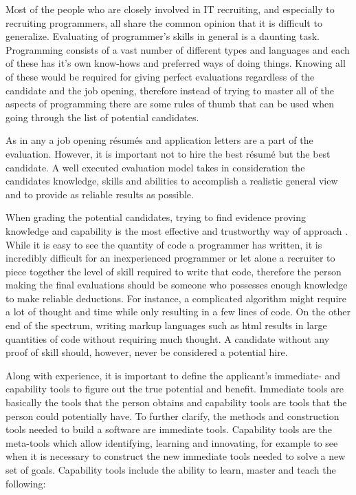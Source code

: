 \documentclass[11pt,a4paper,oneside,article]{memoir}
\begin{document}

Most of the people who are closely involved in IT recruiting, and especially to recruiting programmers, all share the common opinion that it is difficult to generalize. Evaluating of programmer's skills in general is a daunting task. Programming consists of a vast number of different types and languages and each of these has it's own know-hows and preferred ways of doing things. Knowing all of these would be required for giving perfect evaluations regardless of the candidate and the job opening, therefore instead of trying to master all of the aspects of programming there are some rules of thumb that can be used when going through the list of potential candidates.

As in any a job opening résumés and application letters are a part of the evaluation. However, it is important not to hire the best résumé but the best candidate. A well executed evaluation model takes in consideration the candidates knowledge, skills and abilities to accomplish a realistic general view and to provide as reliable results as possible. \cite{odom:article} 

When grading the potential candidates, trying to find evidence proving knowledge and capability is the most effective and trustworthy way of approach \cite[p.~6-7]{mcculler:book}. While it is easy to see the quantity of code a programmer has written, it is incredibly difficult for an inexperienced programmer or let alone a recruiter to piece together the level of skill required to write that code, therefore the person making the final evaluations should be someone who possesses enough knowledge to make reliable deductions. For instance, a complicated algorithm might require a lot of thought and time while only resulting in a few lines of code. On the other end of the spectrum, writing markup languages such as \gls{html} results in large quantities of code without requiring much thought. A candidate without any proof of skill should, however, never be considered a potential hire.

Along with experience, it is important to define the applicant's immediate- and capability tools to figure out the true potential and benefit. Immediate tools are basically the tools that the person obtains and capability tools are tools that the person could potentially have. To further clarify, the methods and construction tools needed to build a software are immediate tools. Capability tools are the meta-tools which allow identifying, learning and innovating, for example to see when it is necessary to construct the new immediate tools needed to solve a new set of goals. Capability tools include the ability to learn, master and teach the following:
\end{document}
